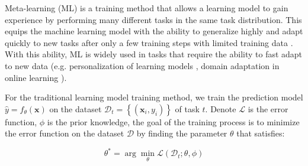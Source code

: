 
Meta-learning (ML) is a training method that allows a learning model to gain experience by performing many different tasks in the same task distribution. This equips the machine learning model with the ability to generalize highly and adapt quickly to new tasks after only a few training steps with limited training data \cite{hospedales2021meta, vettoruzzo2024advances}. With this ability, ML is widely used in tasks that require the ability to fast adapt to new data (e.g. personalization of learning models \cite{chen2018federated, fallah2020personalized,nguyen2022meta}, domain adaptation in online learning \cite{hu2023meta, khoe2024domain}).


For the traditional learning model training method, we train the prediction model $\hat{y} = f_\theta(\mathbf{x})$ on the dataset $\mathcal{D}_t = \left\{ \left(\mathbf{x}_i, y_i \right) \right\}$ of task $t$. Denote $\mathcal{L}$ is the error function, $\phi$ is the prior knowledge, the goal of the training process is to minimize the error function on the dataset $\mathcal{D}$ by finding the parameter $\theta$ that satisfies:

\begin{equation}
    \theta^* = \arg\min_{\theta}{\mathcal{L}(\mathcal{D}_t; \theta, \phi)}
\end{equation}


